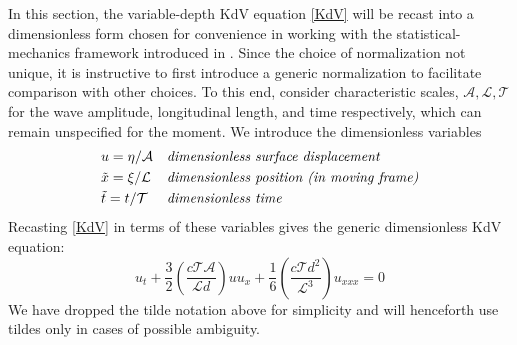 \documentclass[11pt]{article}
\newcommand{\depth}{d}
\newcommand{\ampscale}{\mathcal{A}}
\newcommand{\lengthscale}{\mathcal{L}}
\newcommand{\timescale}{\mathcal{T}}
\begin{document}
In this section, the variable-depth KdV equation \eqref{KdV} will be recast into a dimensionless form chosen for convenience in working with the statistical-mechanics framework introduced in \cite{majda2019statistical}. Since the choice of normalization not unique, it is instructive to first introduce a generic normalization to facilitate comparison with other choices. To this end, consider characteristic scales, $\ampscale, \lengthscale, \timescale$ for the wave amplitude, longitudinal length, and time respectively, which can remain unspecified for the moment. We introduce the dimensionless variables
\begin{align}
&u = \eta / \ampscale
&&\mbox{\em dimensionless surface displacement} \\
&\tilde{x} = \xi / \lengthscale
&&\mbox{\em dimensionless position (in moving frame)} \\
&\tilde{t} = t / \timescale
&&\mbox{\em dimensionless time}
\end{align}
Recasting \eqref{KdV} in terms of these variables gives the generic dimensionless KdV equation:
\begin{equation}
u_t + \frac{3}{2} \left( \frac{c \timescale \ampscale}{\lengthscale \depth} \right) u u_x 
+ \frac{1}{6} \left( \frac{c \timescale \depth^2}{\lengthscale^3} \right) u_{xxx} = 0
\end{equation}
We have dropped the tilde notation above for simplicity and will henceforth use tildes only in cases of possible ambiguity.
\end{document}
